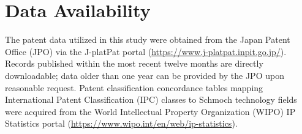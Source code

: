 \section*{Data Availability}
{}
\label{section:data_availability}

The patent data utilized in this study were obtained from the Japan Patent Office (JPO) via the J-platPat portal (\url{https://www.j-platpat.inpit.go.jp/}). Records published within the most recent twelve months are directly downloadable; data older than one year can be provided by the JPO upon reasonable request. Patent classification concordance tables mapping International Patent Classification (IPC) classes to Schmoch technology fields were acquired from the World Intellectual Property Organization (WIPO) IP Statistics portal (\url{https://www.wipo.int/en/web/ip-statistics}).
